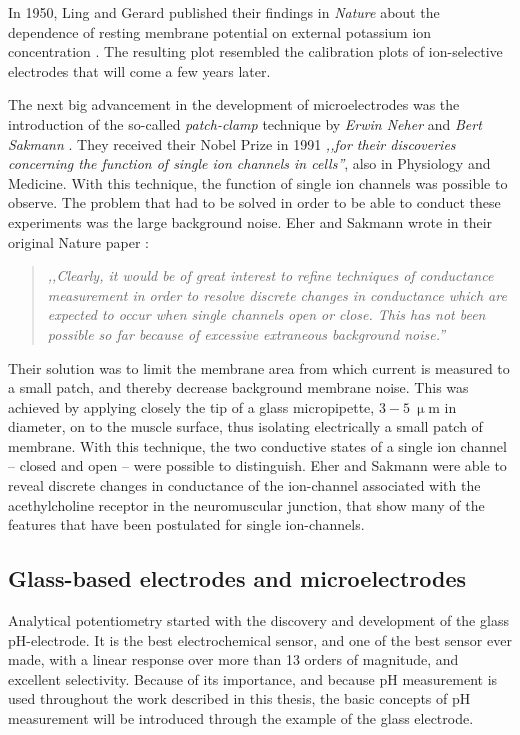 In 1950, Ling and Gerard published their findings in \emph{Nature} about the dependence of resting membrane potential on external potassium ion concentration \cite{ling1950external}.
The resulting plot resembled the calibration plots of ion-selective electrodes that will come a few years later.

The next big advancement in the development of microelectrodes was the introduction of the so-called \emph{patch-clamp} technique by \emph{Erwin Neher} and \emph{Bert Sakmann} \cite{neher1976single, neher1978extracellular}.
They received their Nobel Prize in 1991 \emph{,,for their discoveries concerning the function of single ion channels in cells''}, also in Physiology and Medicine.
With this technique, the function of single ion channels was possible to observe.
The problem that had to be solved in order to be able to conduct these experiments was the large background noise.
Eher and Sakmann wrote in their original Nature paper \cite{neher1976single}:

\begin{quote}
\vspace{0.5cm}
\emph{,,Clearly, it would be of great interest to refine techniques of conductance measurement in order to resolve discrete changes in conductance which are expected to occur when single channels open or close.
This has not been possible so far because of excessive extraneous background noise.''}
\vspace{0.5cm}
\end{quote} 

Their solution was to limit the membrane area from which current is measured to a small patch, and thereby decrease background membrane noise.
This was achieved by applying closely the tip of a glass micropipette, $3-5~\upmu$m in diameter, on to the muscle surface, thus isolating electrically a small patch of membrane.
With this technique, the two conductive states of a single ion channel -- closed and open -- were possible to distinguish.
Eher and Sakmann were able to reveal discrete changes in conductance of the ion-channel associated with the acethylcholine receptor in the neuromuscular junction, that show many of the features that have been postulated for single ion-channels.

\subsection{Glass-based electrodes and microelectrodes}
Analytical potentiometry started with the discovery and development of the glass pH-electrode. It is the best electrochemical sensor, and one of the best sensor ever made, with a linear response over more than 13 orders of magnitude, and excellent selectivity.
Because of its importance, and because pH measurement is used throughout the work described in this thesis, the basic concepts of pH measurement will be introduced through the example of the glass electrode.

